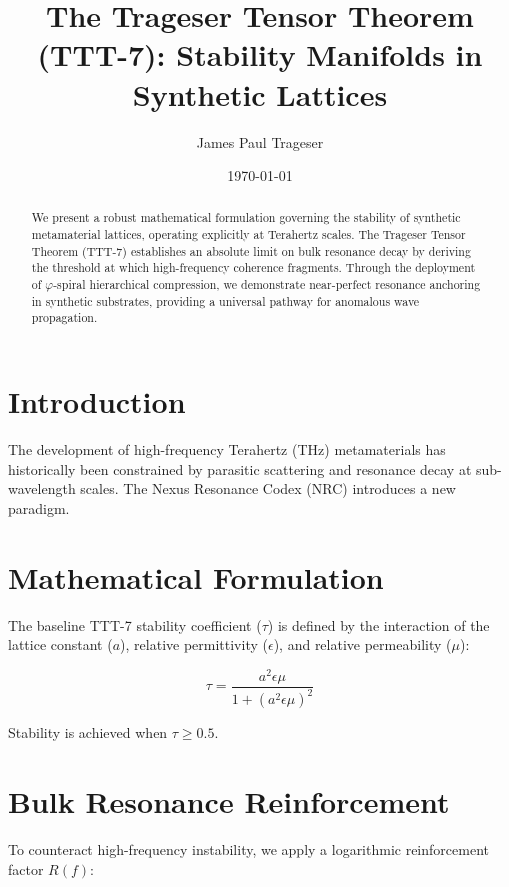 \documentclass[reprint,aps,prl,twocolumn,superscriptaddress,showpacs,amsmath,amssymb]{revtex4-2}
\begin{document}
\title{The Trageser Tensor Theorem (TTT-7): Stability Manifolds in Synthetic Lattices}

\author{James Paul Trageser}

\date{\today}

\begin{abstract}
We present a robust mathematical formulation governing the stability of synthetic metamaterial lattices, operating explicitly at Terahertz scales. The Trageser Tensor Theorem (TTT-7) establishes an absolute limit on bulk resonance decay by deriving the threshold at which high-frequency coherence fragments. Through the deployment of $\varphi$-spiral hierarchical compression, we demonstrate near-perfect resonance anchoring in synthetic substrates, providing a universal pathway for anomalous wave propagation.
\end{abstract}

\maketitle

\section{Introduction}
The development of high-frequency Terahertz (THz) metamaterials has historically been constrained by parasitic scattering and resonance decay at sub-wavelength scales. The Nexus Resonance Codex (NRC) introduces a new paradigm.

\section{Mathematical Formulation}
The baseline TTT-7 stability coefficient ($\tau$) is defined by the interaction of the lattice constant ($a$), relative permittivity ($\epsilon$), and relative permeability ($\mu$):

\begin{equation}
    \tau = \frac{a^2 \epsilon \mu}{1 + (a^2 \epsilon \mu)^2}
\end{equation}

Stability is achieved when $\tau \ge 0.5$.

\section{Bulk Resonance Reinforcement}
To counteract high-frequency instability, we apply a logarithmic reinforcement factor $R(f)$:
\end{document}
